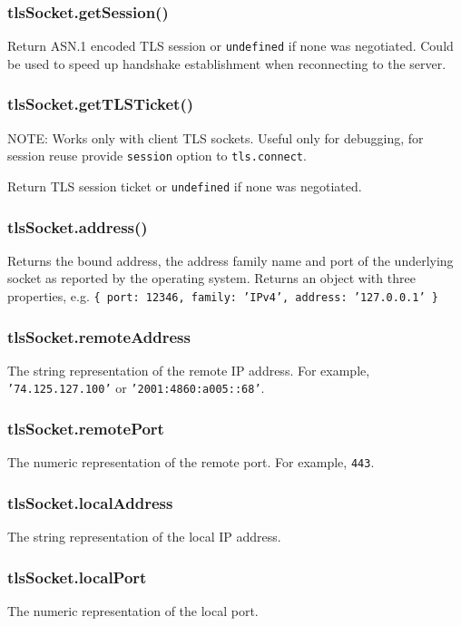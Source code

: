 \subsubsection{tlsSocket.getSession()}\label{tlssocket.getsession}

Return ASN.1 encoded TLS session or \texttt{undefined} if none was
negotiated. Could be used to speed up handshake establishment when
reconnecting to the server.

\subsubsection{tlsSocket.getTLSTicket()}\label{tlssocket.gettlsticket}

NOTE: Works only with client TLS sockets. Useful only for debugging, for
session reuse provide \texttt{session} option to \texttt{tls.connect}.

Return TLS session ticket or \texttt{undefined} if none was negotiated.

\subsubsection{tlsSocket.address()}\label{tlssocket.address}

Returns the bound address, the address family name and port of the
underlying socket as reported by the operating system. Returns an object
with three properties, e.g.
\texttt{\{ port: 12346, family: 'IPv4', address: '127.0.0.1' \}}

\subsubsection{tlsSocket.remoteAddress}\label{tlssocket.remoteaddress}

The string representation of the remote IP address. For example,
\texttt{'74.125.127.100'} or \texttt{'2001:4860:a005::68'}.

\subsubsection{tlsSocket.remotePort}\label{tlssocket.remoteport}

The numeric representation of the remote port. For example,
\texttt{443}.

\subsubsection{tlsSocket.localAddress}\label{tlssocket.localaddress}

The string representation of the local IP address.

\subsubsection{tlsSocket.localPort}\label{tlssocket.localport}

The numeric representation of the local port.
